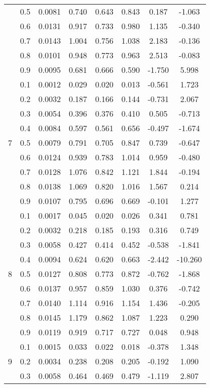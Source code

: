 \documentclass[11pt,a4paper]{report}
\begin{document}
\begin{longtable}{ | c | c || c | c | c | c | c | c | }
 & 0.5 & 0.0081 & 0.740 & 0.643 & 0.843 & 0.187 & -1.063 \\
 & 0.6 & 0.0131 & 0.917 & 0.733 & 0.980 & 1.135 & -0.340 \\
 & 0.7 & 0.0143 & 1.004 & 0.756 & 1.038 & 2.183 & -0.136 \\
 & 0.8 & 0.0101 & 0.948 & 0.773 & 0.963 & 2.513 & -0.083 \\
 & 0.9 & 0.0095 & 0.681 & 0.666 & 0.590 & -1.750 & 5.998 \\
 \hline
\multirow{9}{*}{7} & 0.1 & 0.0012 & 0.029 & 0.020 & 0.013 & -0.561 & 1.723 \\
 & 0.2 & 0.0032 & 0.187 & 0.166 & 0.144 & -0.731 & 2.067 \\
 & 0.3 & 0.0054 & 0.396 & 0.376 & 0.410 & 0.505 & -0.713 \\
 & 0.4 & 0.0084 & 0.597 & 0.561 & 0.656 & -0.497 & -1.674 \\
 & 0.5 & 0.0079 & 0.791 & 0.705 & 0.847 & 0.739 & -0.647 \\
 & 0.6 & 0.0124 & 0.939 & 0.783 & 1.014 & 0.959 & -0.480 \\
 & 0.7 & 0.0128 & 1.076 & 0.842 & 1.121 & 1.844 & -0.194 \\
 & 0.8 & 0.0138 & 1.069 & 0.820 & 1.016 & 1.567 & 0.214 \\
 & 0.9 & 0.0107 & 0.795 & 0.696 & 0.669 & -0.101 & 1.277 \\
 \hline
\multirow{9}{*}{8} & 0.1 & 0.0017 & 0.045 & 0.020 & 0.026 & 0.341 & 0.781 \\
 & 0.2 & 0.0032 & 0.218 & 0.185 & 0.193 & 0.316 & 0.749 \\
 & 0.3 & 0.0058 & 0.427 & 0.414 & 0.452 & -0.538 & -1.841 \\
 & 0.4 & 0.0094 & 0.624 & 0.620 & 0.663 & -2.442 & -10.260 \\
 & 0.5 & 0.0127 & 0.808 & 0.773 & 0.872 & -0.762 & -1.868 \\
 & 0.6 & 0.0137 & 0.957 & 0.859 & 1.030 & 0.376 & -0.742 \\
 & 0.7 & 0.0140 & 1.114 & 0.916 & 1.154 & 1.436 & -0.205 \\
 & 0.8 & 0.0145 & 1.179 & 0.862 & 1.087 & 1.223 & 0.290 \\
 & 0.9 & 0.0119 & 0.919 & 0.717 & 0.727 & 0.048 & 0.948 \\
 \hline
\multirow{9}{*}{9} & 0.1 & 0.0015 & 0.033 & 0.022 & 0.018 & -0.378 & 1.348 \\
 & 0.2 & 0.0034 & 0.238 & 0.208 & 0.205 & -0.192 & 1.090 \\
 & 0.3 & 0.0058 & 0.464 & 0.469 & 0.479 & -1.119 & 2.807 \\

\end{longtable}
\end{document}
